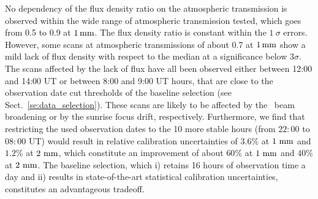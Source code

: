 No dependency of the flux density ratio on the atmospheric transmission
is observed within the wide range of atmospheric transmission tested,
which goes from 0.5 to 0.9 at $1\,\rm{mm}$. The flux
density ratio is constant within the $1~\sigma$ errors. However, some scans at atmospheric
transmissions of about 0.7 at $1\,\rm{mm}$ show a mild lack
of flux density with respect to the median at a significance below
$3\sigma$. The scans affected by the lack of flux have all been observed 
either between 12:00 and 14:00 UT or between 8:00 and 9:00 UT hours,
that are close to the observation date cut thresholds of the baseline
selection (see Sect.~\ref{se:data_selection}). These scans are likely
to be affected by the \afternoon\ beam broadening or by the
sunrise focus drift, respectively. Furthermore, we find that restricting the
used observation dates to the 10 more stable hours (from $22:00$ to
$08:00$ UT) would result in relative calibration uncertainties of
$3.6\%$ at $1~\rm{mm}$ and $1.2\%$ at $2~\rm{mm}$, which constitute an
improvement of about $60\%$ at $1~\rm{mm}$ and $40\%$ at
$2~\rm{mm}$.  
The baseline selection, which i) retains 16 hours of observation time
a day and ii) %
{\lp results in state-of-the-art statistical calibration
uncertainties,} constitutes an advantageous tradeoff.  


